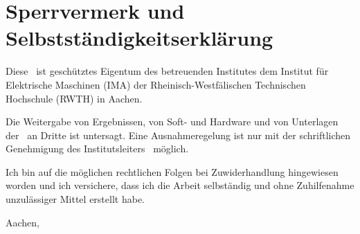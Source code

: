 \chapter{Sperrvermerk und Selbstständigkeitserklärung}

Diese \imaarbeit \ ist geschütztes Eigentum des betreuenden Institutes dem Institut für Elektrische Maschinen (IMA) der Rheinisch-Westfälischen Technischen Hochschule (RWTH) in Aachen.

Die Weitergabe von Ergebnissen, von Soft- und Hardware und von Unterlagen der \imaarbeit \ an Dritte ist untersagt. Eine Ausnahmeregelung ist nur mit der schriftlichen Genehmigung des Institutsleiters \imaprof \ möglich.

Ich bin auf die möglichen rechtlichen Folgen bei Zuwiderhandlung hingewiesen worden und ich versichere, dass ich die Arbeit selbständig und ohne Zuhilfenahme unzulässiger Mittel erstellt habe.

\vspace{1cm}

Aachen, \imadatum

\vspace{2cm}

\imaautor